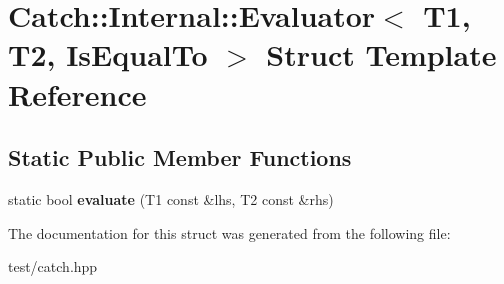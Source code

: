 \hypertarget{structCatch_1_1Internal_1_1Evaluator_3_01T1_00_01T2_00_01IsEqualTo_01_4}{}\section{Catch\+:\+:Internal\+:\+:Evaluator$<$ T1, T2, Is\+Equal\+To $>$ Struct Template Reference}
\label{structCatch_1_1Internal_1_1Evaluator_3_01T1_00_01T2_00_01IsEqualTo_01_4}
\subsection*{Static Public Member Functions}
\begin{DoxyCompactItemize}
\item 
static bool {\bfseries evaluate} (T1 const \&lhs, T2 const \&rhs)\hypertarget{structCatch_1_1Internal_1_1Evaluator_3_01T1_00_01T2_00_01IsEqualTo_01_4_a166b2b7849247397e63fb2940481b217}{}\label{structCatch_1_1Internal_1_1Evaluator_3_01T1_00_01T2_00_01IsEqualTo_01_4_a166b2b7849247397e63fb2940481b217}

\end{DoxyCompactItemize}


The documentation for this struct was generated from the following file\+:\begin{DoxyCompactItemize}
\item 
test/catch.\+hpp\end{DoxyCompactItemize}
